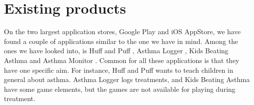 \section{Existing products}
\label{sec:exisiting-products}

On the two largest application stores, Google Play and iOS AppStore, we have found a couple of applications similar to the one we have in mind. Among the ones we have looked into, is Huff and Puff , Asthma Logger
, Kids Beating Asthma  and Asthma Monitor . Common for all these applications is that they have one specific aim. For instance, Huff and Puff wants to teach children in general about asthma. Asthma Logger logs treatments, and Kids Beating Asthma have some game elements, but the games are not available for playing during treatment. 


